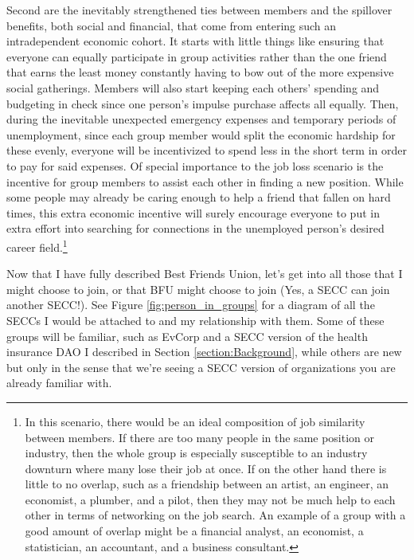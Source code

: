 \documentclass{article}[10pt]
\begin{document}
Second are the inevitably strengthened ties between members and the spillover benefits, both social and financial, that come from entering such an intradependent economic cohort. 
It starts with little things like ensuring that everyone can equally participate in group activities rather than the one friend that earns the least money constantly having to bow out of the more expensive social gatherings. 
Members will also start keeping each others' spending and budgeting in check since one person's impulse purchase affects all equally. 
Then, during the inevitable unexpected emergency expenses and temporary periods of unemployment, since each group member would split the economic hardship for these evenly, everyone will be incentivized to spend less in the short term in order to pay for said expenses. 
Of special importance to the job loss scenario is the incentive for group members to assist each other in finding a new position.
While some people may already be caring enough to help a friend that fallen on hard times, this extra economic incentive will surely encourage everyone to put in extra effort into searching for connections in the unemployed person's desired career field.\footnote{
    In this scenario, there would be an ideal composition of job similarity between members. 
    If there are too many people in the same position or industry, then the whole group is especially susceptible to an industry downturn where many lose their job at once. 
    If on the other hand there is little to no overlap, such as a friendship between an artist, an engineer, an economist, a plumber, and a pilot, then they may not be much help to each other in terms of networking on the job search. 
    An example of a group with a good amount of overlap might be a financial analyst, an economist, a statistician, an accountant, and a business consultant.}\par

Now that I have fully described Best Friends Union, let's get into all those that I might choose to join, or that BFU might choose to join (Yes, a SECC can join another SECC!). 
See Figure \ref{fig:person_in_groups} for a diagram of all the SECCs I would be attached to and my relationship with them. 
Some of these groups will be familiar, such as EvCorp and a SECC version of the health insurance DAO I described in Section \ref{section:Background}, while others are new but only in the sense that we're seeing a SECC version of organizations you are already familiar with. \par
\end{document}
